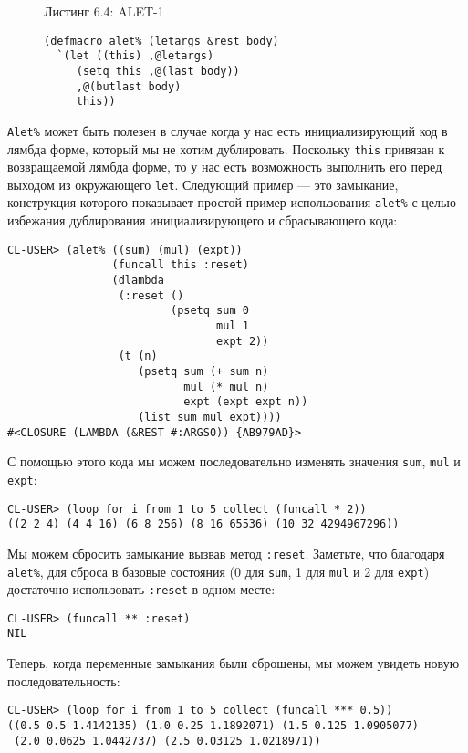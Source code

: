 \begin{figure}Листинг 6.4: ALET-1\label{listing_6.4}
\listbegin
\begin{verbatim}
(defmacro alet% (letargs &rest body)
  `(let ((this) ,@letargs)
     (setq this ,@(last body))
     ,@(butlast body)
     this))
\end{verbatim}
\listend
\end{figure}

\verb"Alet%" может быть полезен в случае когда у нас есть инициализирующий код в лямбда форме, который мы не хотим дублировать. Поскольку \verb"this" привязан к возвращаемой лямбда форме, то у нас есть возможность выполнить его перед выходом из окружающего \verb"let". Следующий пример --- это замыкание, конструкция которого показывает простой пример использования \verb"alet%" с целью избежания дублирования инициализирующего и сбрасывающего кода:

\begin{verbatim}
CL-USER> (alet% ((sum) (mul) (expt))
                (funcall this :reset)
                (dlambda
                 (:reset ()
                         (psetq sum 0
                                mul 1
                                expt 2))
                 (t (n)
                    (psetq sum (+ sum n)
                           mul (* mul n)
                           expt (expt expt n))
                    (list sum mul expt))))
#<CLOSURE (LAMBDA (&REST #:ARGS0)) {AB979AD}>
\end{verbatim}

С помощью этого кода мы можем последовательно изменять значения \verb"sum", \verb"mul" и \verb"expt":

\begin{verbatim}
CL-USER> (loop for i from 1 to 5 collect (funcall * 2))
((2 2 4) (4 4 16) (6 8 256) (8 16 65536) (10 32 4294967296))
\end{verbatim}

Мы можем сбросить замыкание вызвав метод \verb":reset". Заметьте, что благодаря \verb"alet%", для сброса в базовые состояния (0 для \verb"sum", 1 для \verb"mul" и 2 для \verb"expt") достаточно использовать \verb":reset" в одном месте:

\begin{verbatim}
CL-USER> (funcall ** :reset)
NIL
\end{verbatim}

Теперь, когда переменные замыкания были сброшены, мы можем увидеть новую последовательность:

\begin{verbatim}
CL-USER> (loop for i from 1 to 5 collect (funcall *** 0.5))
((0.5 0.5 1.4142135) (1.0 0.25 1.1892071) (1.5 0.125 1.0905077)
 (2.0 0.0625 1.0442737) (2.5 0.03125 1.0218971))
\end{verbatim}

